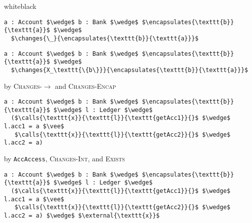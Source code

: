 \documentclass[acmsmall,review,anonymous]{acmart}\settopmatter{printfolios=true,printccs=false,printacmref=false}
\begin{document}
\begin{proofBox}{white}{black}
\footnotesize
\begin{minipage}{0.75\textwidth}
\begin{lstlisting}[language = Chainmail, mathescape=true, frame=single]
a : Account $\wedge$ b : Bank $\wedge$ $\encapsulates{\texttt{b}}{\texttt{a}}$ $\wedge$ 
  $\changes{\_}{\encapsulates{\texttt{b}}{\texttt{a}}}$
\end{lstlisting}
\end{minipage}
\begin{minipage}{0.24\textwidth}
\end{minipage}
\begin{minipage}{0.75\textwidth}
\begin{lstlisting}[language = Chainmail, mathescape=true]
a : Account $\wedge$ b : Bank $\wedge$ $\encapsulates{\texttt{b}}{\texttt{a}}$ $\wedge$ 
  $\changes{X_\texttt{\{b\}}}{\encapsulates{\texttt{b}}{\texttt{a}}}$
\end{lstlisting}
\end{minipage}
\begin{minipage}{0.24\textwidth}
\scriptsize
\hfill by \textsc{Changes}-$\longrightarrow$ and \textsc{Changes-Encap}
\end{minipage}
\begin{minipage}{0.75\textwidth}
\begin{lstlisting}[language = Chainmail, mathescape=true]
a : Account $\wedge$ b : Bank $\wedge$ $\encapsulates{\texttt{b}}{\texttt{a}}$ $\wedge$ l : Ledger $\wedge$ 
  ($\calls{\texttt{x}}{\texttt{l}}{\texttt{getAcc1}}{}$ $\wedge$ l.acc1 = a $\vee$ 
   $\calls{\texttt{x}}{\texttt{l}}{\texttt{getAcc2}}{}$ $\wedge$ l.acc2 = a)
\end{lstlisting}
\end{minipage}
\begin{minipage}{0.24\textwidth}
\scriptsize
\hfill by \texttt{AccAccess}, \textsc{Changes-Int}, and \textsc{Exists}
\end{minipage}
\begin{minipage}{0.75\textwidth}
\begin{lstlisting}[language = Chainmail, mathescape=true]
a : Account $\wedge$ b : Bank $\wedge$ $\encapsulates{\texttt{b}}{\texttt{a}}$ $\wedge$ l : Ledger $\wedge$ 
  ($\calls{\texttt{x}}{\texttt{l}}{\texttt{getAcc1}}{}$ $\wedge$ l.acc1 = a $\vee$ 
   $\calls{\texttt{x}}{\texttt{l}}{\texttt{getAcc2}}{}$ $\wedge$ l.acc2 = a) $\wedge$ $\external{\texttt{x}}$
\end{lstlisting}

\end{minipage}
\end{proofBox}
\end{document}
